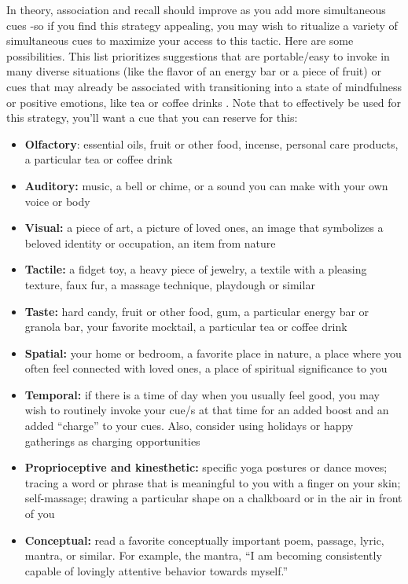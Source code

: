 \documentclass[12pt,letterpaper]{article}
\begin{document}
In theory, association and recall should improve as you add more simultaneous cues -so if you find this strategy appealing, you may wish to ritualize a variety of simultaneous cues to maximize your access to this tactic. Here are some possibilities. This list prioritizes suggestions that are portable/easy to invoke in many diverse situations (like the flavor of an energy bar or a piece of fruit) or cues that may already be associated with transitioning into a state of mindfulness or positive emotions, like tea or coffee drinks . Note that to effectively be used for this strategy, you'll want a cue that you can reserve for this:
\begin{itemize}
    \item \textbf{Olfactory}: essential oils, fruit or other food, incense, personal care products, a particular tea or coffee drink
    \item \textbf{Auditory:} music, a bell or chime, or a sound you can make with your own voice or body 
    \item \textbf{Visual:} a piece of art, a picture of loved ones, an image that symbolizes a beloved identity or occupation, an item from nature
    \item \textbf{Tactile:} a fidget toy, a heavy piece of jewelry, a textile with a pleasing texture, faux fur, a massage technique, playdough or similar
    \item \textbf{Taste:} hard candy, fruit or other food, gum, a particular energy bar or granola bar, your favorite mocktail, a particular tea or coffee drink
    \item \textbf{Spatial:} your home or bedroom, a favorite place in nature, a place where you often feel connected with loved ones, a place of spiritual significance to you
    \item \textbf{Temporal:} if there is a time of day when you usually feel good, you may wish to routinely invoke your cue/s at that time for an added boost and an added “charge” to your cues. Also, consider using holidays or happy gatherings as charging opportunities
    \item \textbf{Proprioceptive and kinesthetic:} specific yoga postures or dance moves; tracing a word or phrase that is meaningful to you with a finger on your skin; self-massage; drawing a particular shape on a chalkboard or in the air in front of you
    \item \textbf{Conceptual:} read a favorite conceptually important poem, passage, lyric, mantra, or similar. For example, the mantra, “I am becoming consistently capable of lovingly attentive behavior towards myself.”
\end{itemize}
\end{document}
